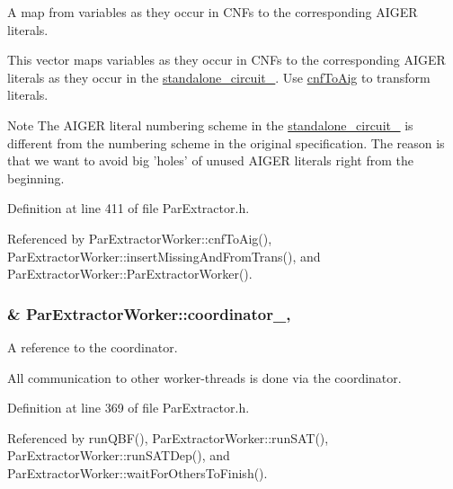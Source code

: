 A map from variables as they occur in C\-N\-Fs to the corresponding A\-I\-G\-E\-R literals. 

This vector maps variables as they occur in C\-N\-Fs to the corresponding A\-I\-G\-E\-R literals as they occur in the \hyperlink{classParExtractorWorker_a233a7f99946695b0640e76ead6932fbb}{standalone\-\_\-circuit\-\_\-}. Use \hyperlink{classParExtractorWorker_af32545578987bf8d7e2d6c09fb24e716}{cnf\-To\-Aig} to transform literals.

\begin{DoxyNote}{Note}
The A\-I\-G\-E\-R literal numbering scheme in the \hyperlink{classParExtractorWorker_a233a7f99946695b0640e76ead6932fbb}{standalone\-\_\-circuit\-\_\-} is different from the numbering scheme in the original specification. The reason is that we want to avoid big 'holes' of unused A\-I\-G\-E\-R literals right from the beginning. 
\end{DoxyNote}


Definition at line 411 of file Par\-Extractor.\-h.



Referenced by Par\-Extractor\-Worker\-::cnf\-To\-Aig(), Par\-Extractor\-Worker\-::insert\-Missing\-And\-From\-Trans(), and Par\-Extractor\-Worker\-::\-Par\-Extractor\-Worker().

\hypertarget{classParExtractorWorker_a749b01fd5ad1a57ae5793db2bb3b4e47}{
\subsubsection[{coordinator\-\_\-}]{\& Par\-Extractor\-Worker\-::coordinator\-\_\-\hspace{0.3cm}{\ttfamily [protected]}, {\ttfamily [inherited]}}}\label{classParExtractorWorker_a749b01fd5ad1a57ae5793db2bb3b4e47}


A reference to the coordinator. 

All communication to other worker-\/threads is done via the coordinator. 

Definition at line 369 of file Par\-Extractor.\-h.



Referenced by run\-Q\-B\-F(), Par\-Extractor\-Worker\-::run\-S\-A\-T(), Par\-Extractor\-Worker\-::run\-S\-A\-T\-Dep(), and Par\-Extractor\-Worker\-::wait\-For\-Others\-To\-Finish().

